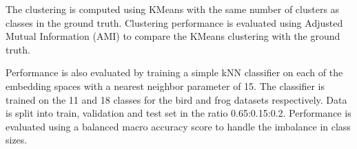 
The clustering is computed using KMeans with the same number of clusters as classes in the ground truth. 
Clustering performance is evaluated using Adjusted Mutual Information (AMI) \cite{romano_standardized_2014} to compare the KMeans clustering with the ground truth.

Performance is also evaluated by training a simple kNN classifier on each of the embedding spaces with a nearest neighbor parameter of 15.
The classifier is trained on the 11 and 18 classes for the bird and frog datasets respectively.
Data is split into train, validation and test set in the ratio 0.65:0.15:0.2.
Performance is evaluated using a balanced macro accuracy score \cite{brodersen_balanced_2010} to handle the imbalance in class sizes.

